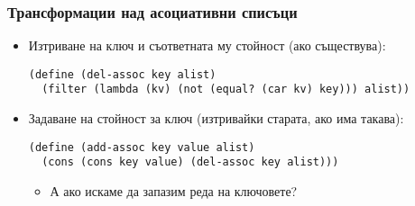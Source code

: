 \documentclass[alsotrans]{beamerswitch}
\begin{document}
\begin{frame}[fragile]
  \frametitle{Трансформации над асоциативни списъци}

  \begin{itemize}[<+->]
  \item Изтриване на ключ и съответната му стойност (ако съществува):\\
    \onslide<+->
\begin{lstlisting}
(define (del-assoc key alist)
  (filter (lambda (kv) (not (equal? (car kv) key))) alist))
\end{lstlisting}
  \item Задаване на стойност за ключ (изтривайки старата, ако има такава):\\
    \onslide<+->
\begin{lstlisting}
(define (add-assoc key value alist)
  (cons (cons key value) (del-assoc key alist)))
\end{lstlisting}
    \begin{itemize}
    \item А ако искаме да запазим реда на ключовете?
    \end{itemize}
  \end{itemize}
\end{frame}
\begin{comment}
\begin{frame}[fragile]
  \frametitle{Задаване на стойност за ключ}
\small
  \textbf{Вариант №1 (грозен и по-бърз):}
\begin{lstlisting}
(define (add-key-value key value alist)
   (let ((new-kv (cons key value)))
        (cond ((null? alist) (list new-kv))
              ((eqv? (caar alist) key) (cons new-kv (cdr alist)))
              (else (cons (car alist)
                    (add-key-value key value (cdr alist))))))
\end{lstlisting}
  \pause
  \textbf{Вариант №2 (красив и по-бавен):}
\begin{lstlisting}
(define (add-key-value key value alist)
  (let ((new-kv (cons key value)))
       (if (assq key alist)
           (map (lambda (kv) (if (eq? (car kv) key)
                                 new-kv kv)) alist)
           (cons new-kv alist))))
\end{lstlisting}
\end{frame}
\end{comment}
\end{document}

